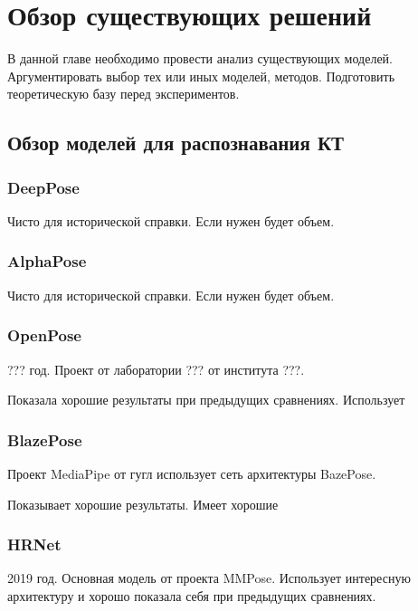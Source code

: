 \section{Обзор существующих решений}
\label{sec:Chapter4} 

В данной главе необходимо провести анализ существующих моделей. Аргументировать выбор тех или иных моделей, методов. Подготовить теоретическую базу перед экспериментов.

\subsection{Обзор моделей для распознавания КТ}

\subsubsection{DeepPose}

Чисто для исторической справки. Если нужен будет объем.

\subsubsection{AlphaPose}

Чисто для исторической справки. Если нужен будет объем.

\subsubsection{OpenPose}

??? год. Проект от лаборатории ??? от института ???. 

Показала хорошие результаты при предыдущих сравнениях. Использует

\subsubsection{BlazePose}

Проект MediaPipe от гугл использует сеть архитектуры BazePose.

Показывает хорошие результаты. Имеет хорошие

\subsubsection{HRNet}

2019 год. Основная модель от проекта MMPose. Использует интересную архитектуру и хорошо показала себя при предыдущих сравнениях.

